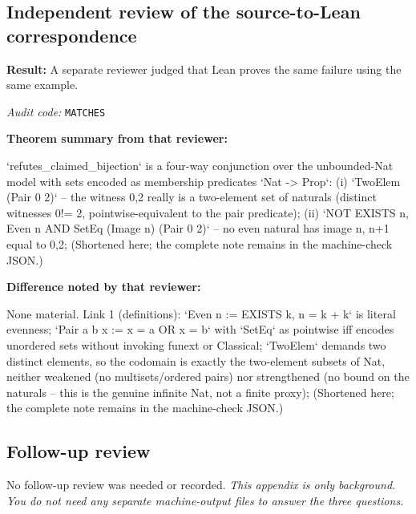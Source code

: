 \documentclass[11pt]{article}
\begin{document}
\subsection*{Independent review of the source-to-Lean correspondence}
\textbf{Result:} A separate reviewer judged that Lean proves the same failure using the same example.
\par\textit{Audit code:} \nolinkurl{MATCHES}
\par\textbf{Theorem summary from that reviewer:}
\begin{Vsrc}
`refutes_claimed_bijection` is a four-way conjunction over the unbounded-Nat model with sets encoded as membership predicates `Nat -> Prop`: (i) `TwoElem (Pair 0 2)` -- the witness {0,2} really is a two-element set of naturals (distinct witnesses 0!= 2, pointwise-equivalent to the pair predicate); (ii) `NOT EXISTS n, Even n AND SetEq (Image n) (Pair 0 2)` -- no even natural has image {n, n+1} equal to {0,2}; (Shortened here; the complete note remains in the machine-check JSON.)
\end{Vsrc}
\par\textbf{Difference noted by that reviewer:}
\begin{Vsrc}
None material. Link 1 (definitions): `Even n := EXISTS k, n = k + k` is literal evenness; `Pair a b x := x = a OR x = b` with `SetEq` as pointwise iff encodes unordered sets without invoking funext or Classical; `TwoElem` demands two distinct elements, so the codomain is exactly the two-element subsets of Nat, neither weakened (no multisets/ordered pairs) nor strengthened (no bound on the naturals -- this is the genuine infinite Nat, not a finite proxy); (Shortened here; the complete note remains in the machine-check JSON.)
\end{Vsrc}
\subsection*{Follow-up review}
No follow-up review was needed or recorded.
\textit{This appendix is only background. You do not need any separate machine-output files to answer the three questions.}
\end{document}
